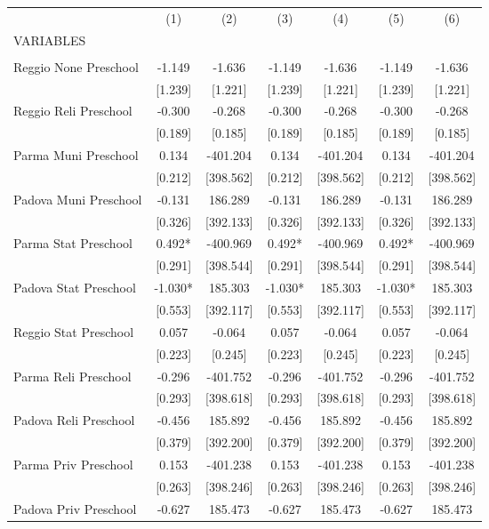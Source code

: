 \begin{tabular}{lcccccc} \hline
 & (1) & (2) & (3) & (4) & (5) & (6) \\
VARIABLES &  &  &  &  &  &  \\ \hline
 &  &  &  &  &  &  \\
Reggio None Preschool & -1.149 & -1.636 & -1.149 & -1.636 & -1.149 & -1.636 \\
 & [1.239] & [1.221] & [1.239] & [1.221] & [1.239] & [1.221] \\
Reggio Reli Preschool & -0.300 & -0.268 & -0.300 & -0.268 & -0.300 & -0.268 \\
 & [0.189] & [0.185] & [0.189] & [0.185] & [0.189] & [0.185] \\
Parma Muni Preschool & 0.134 & -401.204 & 0.134 & -401.204 & 0.134 & -401.204 \\
 & [0.212] & [398.562] & [0.212] & [398.562] & [0.212] & [398.562] \\
Padova Muni Preschool & -0.131 & 186.289 & -0.131 & 186.289 & -0.131 & 186.289 \\
 & [0.326] & [392.133] & [0.326] & [392.133] & [0.326] & [392.133] \\
Parma Stat Preschool & 0.492* & -400.969 & 0.492* & -400.969 & 0.492* & -400.969 \\
 & [0.291] & [398.544] & [0.291] & [398.544] & [0.291] & [398.544] \\
Padova Stat Preschool & -1.030* & 185.303 & -1.030* & 185.303 & -1.030* & 185.303 \\
 & [0.553] & [392.117] & [0.553] & [392.117] & [0.553] & [392.117] \\
Reggio Stat Preschool & 0.057 & -0.064 & 0.057 & -0.064 & 0.057 & -0.064 \\
 & [0.223] & [0.245] & [0.223] & [0.245] & [0.223] & [0.245] \\
Parma Reli Preschool & -0.296 & -401.752 & -0.296 & -401.752 & -0.296 & -401.752 \\
 & [0.293] & [398.618] & [0.293] & [398.618] & [0.293] & [398.618] \\
Padova Reli Preschool & -0.456 & 185.892 & -0.456 & 185.892 & -0.456 & 185.892 \\
 & [0.379] & [392.200] & [0.379] & [392.200] & [0.379] & [392.200] \\
Parma Priv Preschool & 0.153 & -401.238 & 0.153 & -401.238 & 0.153 & -401.238 \\
 & [0.263] & [398.246] & [0.263] & [398.246] & [0.263] & [398.246] \\
Padova Priv Preschool & -0.627 & 185.473 & -0.627 & 185.473 & -0.627 & 185.473 \\

\end{tabular}
